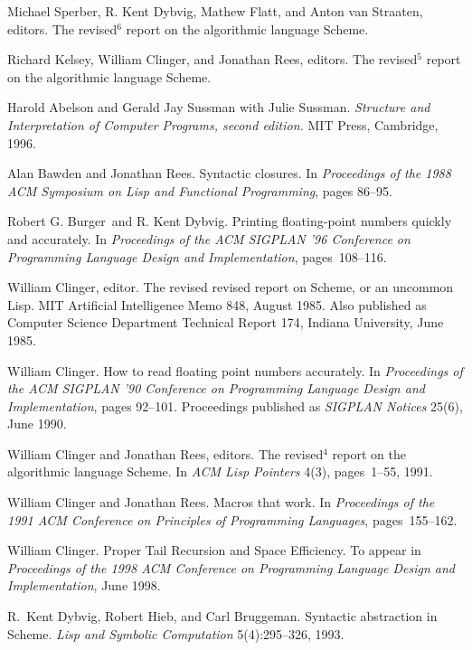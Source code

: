 \begin{thebibliography}{999}

Michael Sperber, R. Kent Dybvig, Mathew Flatt, and Anton van Straaten, editors.
The revised$^6$ report on the algorithmic language Scheme.

Richard Kelsey, William Clinger, and Jonathan Rees, editors.
The revised$^5$ report on the algorithmic language Scheme.

Harold Abelson and Gerald Jay Sussman with Julie Sussman.
{\em Structure and Interpretation of Computer Programs, second edition.}
MIT Press, Cambridge, 1996.

Alan Bawden and Jonathan Rees.
Syntactic closures.
In {\em Proceedings of the 1988 ACM Symposium on Lisp and
  Functional Programming}, pages 86--95.

Robert G. Burger~and R. Kent Dybvig.
Printing floating-point numbers quickly and accurately.
In {\em Proceedings of the ACM SIGPLAN '96 Conference
  on Programming Language Design and Implementation}, pages~108--116.

William Clinger, editor.
The revised revised report on Scheme, or an uncommon Lisp.
MIT Artificial Intelligence Memo 848, August 1985.
Also published as Computer Science Department Technical Report 174,
  Indiana University, June 1985.

William Clinger.
How to read floating point numbers accurately.
In {\em Proceedings of the ACM SIGPLAN '90 Conference
  on Programming Language Design and Implementation}, pages 92--101.
Proceedings published as {\em SIGPLAN Notices} 25(6), June 1990.

William Clinger and Jonathan Rees, editors.
The revised$^4$ report on the algorithmic language Scheme.
In {\em ACM Lisp Pointers} 4(3), pages~1--55, 1991.

William Clinger and Jonathan Rees.
Macros that work.
In {\em Proceedings of the 1991 ACM Conference on Principles of
  Programming Languages}, pages~155--162.

William Clinger.
Proper Tail Recursion and Space Efficiency.
To appear in {\em Proceedings of the 1998 ACM Conference on Programming
 Language Design and Implementation}, June 1998.

R.~Kent Dybvig, Robert Hieb, and Carl Bruggeman.
Syntactic abstraction in Scheme.
{\em Lisp and Symbolic Computation} 5(4):295--326, 1993.


\end{thebibliography}
